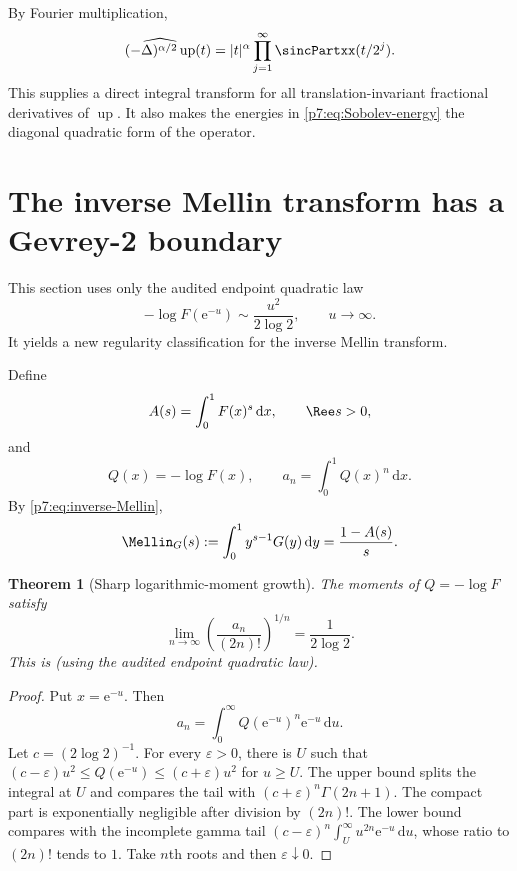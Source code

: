 \documentclass[11pt,oneside]{article}
\newtheorem{theorem}{Theorem}[section]
\theoremstyle{definition}
\theoremstyle{remark}
\newcommand{\Up}{\operatorname{up}}
\newcommand{\dd}{\,\mathrm d}
\newcommand{\e}{\mathrm e}
\newcommand{\1}{\mathbf 1}
\begin{document}
By Fourier multiplication,
\begin{equation}
 \widehat{(-\Delta)^{\alpha/2}\Up}(t)
 =|t|^\alpha\prod_{j=1}^{\infty}\sincPartxx(t/2^j).
 \label{p7:eq:Riesz-transform-up}
\end{equation}
This supplies a direct integral transform for all translation-invariant fractional derivatives
of $\Up$.  It also makes the energies in \cref{p7:eq:Sobolev-energy} the diagonal quadratic form
of the operator.

\section{The inverse Mellin transform has a Gevrey-2 boundary}
\label{p7:sec:Gevrey}

This section uses only the audited endpoint quadratic law
\begin{equation}
 -\log F(\e^{-u})\sim\frac{u^2}{2\log2},\qquad u\to\infty.
 \label{p7:eq:endpoint-quadratic-u}
\end{equation}
It yields a new regularity classification for the inverse Mellin transform.

Define
\begin{equation}
 A(s)=\int_0^1F(x)^s\dd x,
 \qquad \Ree s>0,
 \label{p7:eq:A-s}
\end{equation}
and
\begin{equation}
 Q(x)=-\log F(x),
 \qquad
 a_n=\int_0^1Q(x)^n\dd x.
 \label{p7:eq:Q-an}
\end{equation}
By \cref{p7:eq:inverse-Mellin},
\begin{equation}
 \Mellin_G(s):=\int_0^1y^{s-1}G(y)\dd y=\frac{1-A(s)}s.
 \label{p7:eq:MG-A}
\end{equation}

\begin{theorem}[Sharp logarithmic-moment growth]
\label{p7:thm:an-growth}
The moments of $Q=-\log F$ satisfy
\begin{equation}
 \boxed{
 \lim_{n\to\infty}
 \left(\frac{a_n}{(2n)!}\right)^{1/n}
 =\frac1{2\log2}.}
 \label{p7:eq:an-growth}
\end{equation}
This is \statusderived{} (using the audited endpoint quadratic law).
\end{theorem}

\begin{proof}
Put $x=\e^{-u}$.  Then
\[
 a_n=\int_0^\infty Q(\e^{-u})^n\e^{-u}\dd u.
\]
Let $c=(2\log2)^{-1}$.  For every $\varepsilon>0$, there is $U$ such that
$(c-\varepsilon)u^2\le Q(\e^{-u})\le(c+\varepsilon)u^2$ for $u\ge U$.
The upper bound splits the integral at $U$ and compares the tail with
$(c+\varepsilon)^n\Gamma(2n+1)$.  The compact part is exponentially negligible after
division by $(2n)!$.  The lower bound compares with the incomplete gamma tail
$(c-\varepsilon)^n\int_U^\infty u^{2n}\e^{-u}\dd u$, whose ratio to $(2n)!$ tends to $1$.
Take $n$th roots and then $\varepsilon\downarrow0$.
\end{proof}
\end{document}
